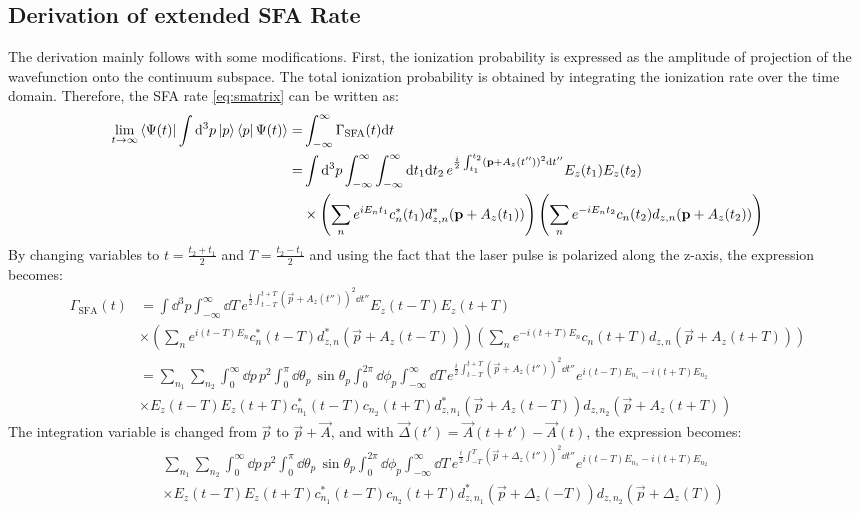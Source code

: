 \subsection{Derivation of extended SFA Rate}
The derivation mainly follows \cite{Theory_NPS} with some modifications.
First, the ionization probability is expressed as the amplitude of projection of the wavefunction onto the continuum subspace.
The total ionization probability is obtained by integrating the ionization rate over the time domain.
Therefore, the SFA rate \eqref{eq:smatrix} can be written as:
\begin{align*}
    \lim_{t\to\infty}\braket{\Psi(t)|\int \dd^3 p \ket{p}\bra{p}\Psi(t)} = &\int_{-\infty}^{\infty} \Gamma_{\mathrm{SFA}}(t) \dd t \\ %
    = &\int \dd^3 p \int_{-\infty}^{\infty} \int_{-\infty}^{\infty} \dd t_1  \dd t_2 \, e^{\frac{i}{2}\int_{t_1}^{t_2}(\vec{p}+A_z(t''))^2\dd t''} E_z(t_1)E_z(t_2)\\
    &\times\left(\sum_{n}e^{iE_nt_1}c_n^*(t_1)d_{z,n}^*(\vec{p}+A_z(t_1))\right)\left(\sum_{n}e^{-iE_nt_2}c_n(t_2)d_{z,n}(\vec{p}+A_z(t_2))\right)
\end{align*}
By changing variables to $t=\frac{t_2+t_1}{2}$ and $T=\frac{t_2-t_1}{2}$ and using the fact that the laser pulse is polarized along the z-axis, the expression becomes:
\begin{align*}
    \Gamma_{\mathrm{SFA}}(t) &= \int \dd^3 p \int_{-\infty}^{\infty} \dd T \, e^{\frac{i}{2}\int_{t-T}^{t+T}(\vec{p}+A_z(t''))^2\dd t''} E_z(t-T) E_z(t+T)\\
    &\times\left(\sum_{n}e^{i(t-T)E_n}c_n^*(t-T)d_{z,n}^*(\vec{p}+A_z(t-T))\right)\left(\sum_{n}e^{-i(t+T)E_n}c_n(t+T)d_{z,n}(\vec{p}+A_z(t+T))\right)\\
    &= \sum_{n_1}\sum_{n_2} \int_0^{\infty} \dd p\,p^2\int_0^{\pi} \dd\theta_p\,\sin\theta_p \int_0^{2\pi}\dd \phi_p\int_{-\infty}^{\infty} \dd T \, e^{\frac{i}{2}\int_{t-T}^{t+T}(\vec{p}+A_z(t''))^2\dd t''} e^{i(t-T)E_{n_1}-i(t+T)E_{n_2}}\\
    &\times E_z(t-T) E_z(t+T)c_{n_1}^*(t-T)c_{n_2}(t+T) d_{z,n_1}^*(\vec{p}+A_z(t-T))d_{z,n_2}(\vec{p}+A_z(t+T))
\end{align*}
The integration variable is changed from $\vec{p}$ to $\vec{p}+\vec{A}$, and with $\vec{\Delta}(t') = \vec{A}(t+t') - \vec{A}(t)$, the expression becomes:
\begin{align*}
    &\sum_{n_1}\sum_{n_2} \int_0^{\infty} \dd p\,p^2\int_0^{\pi} \dd\theta_p\,\sin\theta_p \int_0^{2\pi}\dd \phi_p\int_{-\infty}^{\infty} \dd T \, e^{\frac{i}{2}\int_{-T}^{T}(\vec{p}+\Delta_z(t''))^2\dd t''} e^{i(t-T)E_{n_1}-i(t+T)E_{n_2}}\\
    &\times E_z(t-T) E_z(t+T)c_{n_1}^*(t-T)c_{n_2}(t+T) d_{z,n_1}^*(\vec{p}+\Delta_z(-T))d_{z,n_2}(\vec{p}+\Delta_z(T))
\end{align*} 
